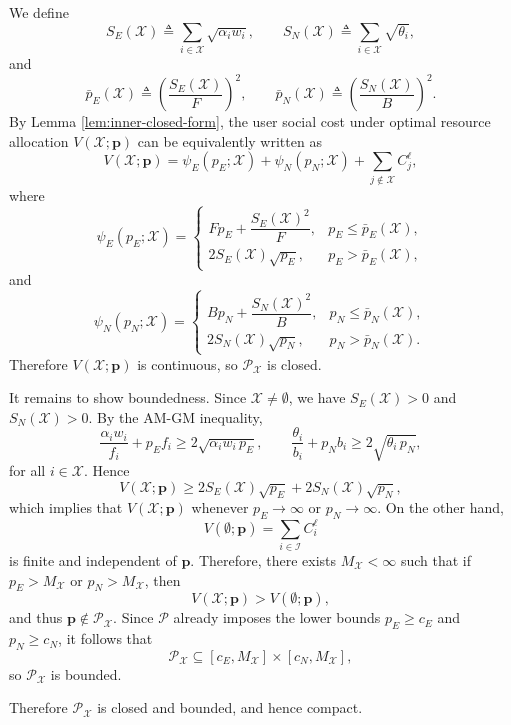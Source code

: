 \documentclass[lettersize,journal]{IEEEtran}
\begin{document}
We define 
\[
S_E(\mathcal X)\triangleq\sum_{i\in\mathcal X}\sqrt{\alpha_i w_i},
\qquad
S_N(\mathcal X)\triangleq\sum_{i\in\mathcal X}\sqrt{\theta_i},
\]
and
\[
\bar p_E(\mathcal X)\triangleq\left(\frac{S_E(\mathcal X)}{F}\right)^2,
\qquad
\bar p_N(\mathcal X)\triangleq\left(\frac{S_N(\mathcal X)}{B}\right)^2.
\]
By Lemma \ref{lem:inner-closed-form}, the user social cost under optimal resource allocation $V(\mathcal{X};\boldsymbol{p})$ can be equivalently written as
\[
V(\mathcal{X};\boldsymbol{p})
=
\psi_E(p_E;\mathcal X)+\psi_N(p_N;\mathcal X)+\sum_{j\notin\mathcal X} C_j^\ell,
\]
where
\[
\psi_E(p_E;\mathcal X)=
\begin{cases}
Fp_E+\dfrac{S_E(\mathcal X)^2}{F}, & p_E\le \bar p_E(\mathcal X),\\[1ex]
2S_E(\mathcal X)\sqrt{p_E}, & p_E>\bar p_E(\mathcal X),
\end{cases}
\]
and
\[
\psi_N(p_N;\mathcal X)=
\begin{cases}
Bp_N+\dfrac{S_N(\mathcal X)^2}{B}, & p_N\le \bar p_N(\mathcal X),\\[1ex]
2S_N(\mathcal X)\sqrt{p_N}, & p_N>\bar p_N(\mathcal X).
\end{cases}
\]
Therefore $V(\mathcal{X};\boldsymbol{p})$ is continuous, so $\mathcal P_{\mathcal X}$ is closed.

It remains to show boundedness. Since $\mathcal X\neq\emptyset$, we have
$S_E(\mathcal X)>0$ and $S_N(\mathcal X)>0$. By the AM-GM inequality,
\[
\frac{\alpha_i w_i}{f_i}+p_E f_i \ge 2\sqrt{\alpha_i w_i\,p_E},
\qquad
\frac{\theta_i}{b_i}+p_N b_i \ge 2\sqrt{\theta_i\,p_N},
\]
for all $i\in\mathcal X$. Hence
\[
V(\mathcal{X};\boldsymbol{p})\ge 2S_E(\mathcal X)\sqrt{p_E}+2S_N(\mathcal X)\sqrt{p_N},
\]
which implies that $V(\mathcal{X};\boldsymbol{p})$ whenever $p_E\to\infty$ or $p_N\to\infty$.
On the other hand,
\[
V(\emptyset;\boldsymbol{p})=\sum_{i\in\mathcal I} C_i^\ell
\]
is finite and independent of $\boldsymbol{p}$. Therefore, there exists $M_{\mathcal X}<\infty$ such that if $p_E>M_{\mathcal X}$ or $p_N>M_{\mathcal X}$, then
\[
V(\mathcal{X};\boldsymbol{p})>V(\emptyset;\boldsymbol{p}),
\]
and thus $\boldsymbol{p}\notin\mathcal P_{\mathcal X}$. Since $\mathcal P$ already imposes the lower bounds $p_E\ge c_E$ and $p_N\ge c_N$, it follows that
\[
\mathcal P_{\mathcal X}\subseteq [c_E,M_{\mathcal X}]\times[c_N,M_{\mathcal X}],
\]
so $\mathcal P_{\mathcal X}$ is bounded.

Therefore $\mathcal P_{\mathcal X}$ is closed and bounded, and hence compact.
\end{document}
